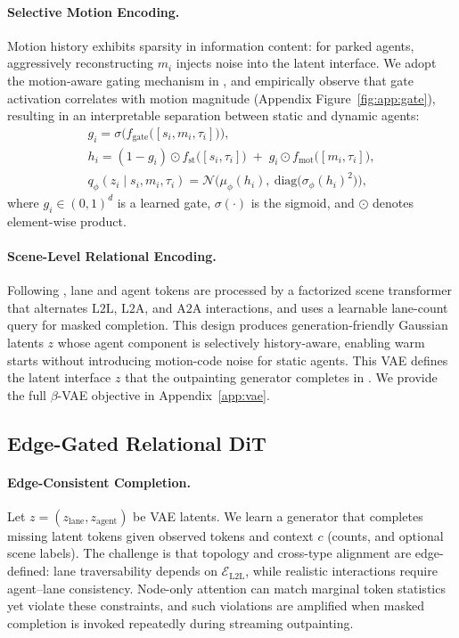 \documentclass{article}
\newcommand{\EdgeDiT}{edge-gated relational DiT}
\theoremstyle{plain}
\theoremstyle{definition}
\theoremstyle{remark}
\begin{document}
\paragraph{Selective Motion Encoding.}
Motion history exhibits sparsity in information content: for parked agents, aggressively reconstructing \(m_i\) injects noise into the latent interface.
We adopt the motion-aware gating mechanism in , and empirically observe that gate activation correlates with motion magnitude (Appendix Figure~\ref{fig:app:gate}), resulting in an interpretable separation between static and dynamic agents:
\begin{equation}
\label{eq:vae_core}
\begin{gathered}
g_i = \sigma\!\Big(f_{\mathrm{gate}}\big([s_i, m_i, \tau_i]\big)\Big), \\
h_i = (1-g_i)\odot f_{\mathrm{st}}\big([s_i,\tau_i]\big)\;+\;g_i\odot f_{\mathrm{mot}}\big([m_i,\tau_i]\big), \\
q_\phi(z_i \mid s_i, m_i, \tau_i) = \mathcal{N}\!\Big(\mu_\phi(h_i),\ \mathrm{diag}\!\big(\sigma_\phi(h_i)^2\big)\Big),
\end{gathered}
\end{equation}
where \(g_i\in(0,1)^{d}\) is a learned gate, \(\sigma(\cdot)\) is the sigmoid, and \(\odot\) denotes element-wise product.

\paragraph{Scene-Level Relational Encoding.}
Following , lane and agent tokens are processed by a factorized scene transformer that alternates
\(\mathrm{L2L}\), \(\mathrm{L2A}\), and \(\mathrm{A2A}\) interactions, and uses a learnable lane-count query for masked completion.
This design produces generation-friendly Gaussian latents \(z\) whose agent component is selectively history-aware,
enabling warm starts without introducing motion-code noise for static agents.
This VAE defines the latent interface \(z\) that the outpainting generator completes in .
We provide the full \(\beta\)-VAE objective in Appendix~\ref{app:vae}.

\subsection{Edge-Gated Relational DiT}
\label{sec:dit}
\paragraph{Edge-Consistent Completion.}
Let \(z=(z_{\mathrm{lane}}, \allowbreak z_{\mathrm{agent}})\) be VAE latents.
We learn a generator that completes missing latent tokens given observed tokens and context \(c\) (counts, and optional scene labels). The challenge is that topology and cross-type alignment are edge-defined:
lane traversability depends on \(\mathcal{E}_{\mathrm{L2L}}\), while realistic interactions require agent--lane consistency.
Node-only attention can match marginal token statistics yet violate these constraints,
and such violations are amplified when masked completion is invoked repeatedly during streaming outpainting.
\end{document}
